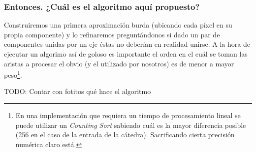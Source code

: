 \subsubsection{Entonces. ¿Cuál es el algoritmo aquí propuesto?}

Construiremos una primera aproximación burda (ubicando cada píxel en su propia
componente) y lo refinaremos preguntándonos si dado un par de componentes
unidas por un eje éstas no deberían en realidad unirse. A la hora de ejecutar
un algorimo así de goloso es importante el orden en el cuál se toman las
aristas a procesar el obvio (y el utilizado por nosotros) es de menor a mayor
peso\footnote{ En una implementación que requiera un tiempo de procesamiento
lineal se puede utilizar un \emph{Counting Sort} sabiendo cuál es la mayor
diferencia posible (256 en el caso de la entrada de la cátedra). Sacrificando
cierta precisión numérica claro está.}.

TODO: Contar con fotitos qué hace el algoritmo

